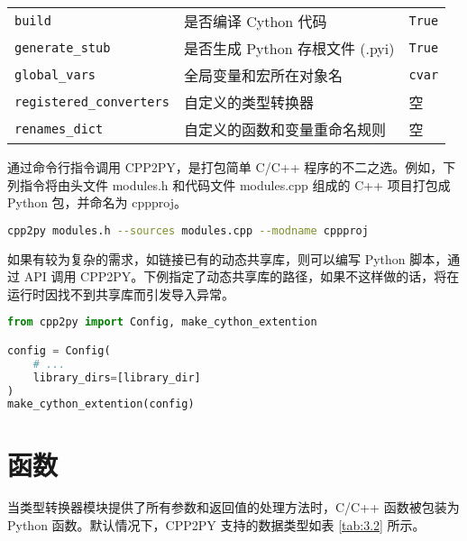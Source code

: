 \begin{table}
\begin{tabular}{lll}
     \lstinline$build$                  &  是否编译 Cython 代码                      &  \lstinline$True$     \\
     \lstinline$generate_stub$          &  是否生成 Python 存根文件 (.pyi)           &  \lstinline$True$     \\
     \lstinline$global_vars$            &  全局变量和宏所在对象名                    &  \lstinline$cvar$     \\
     \lstinline$registered_converters$  &  自定义的类型转换器                        &  空       \\
     \lstinline$renames_dict$           &  自定义的函数和变量重命名规则              &  空       \\
    \bottomrule
  \end{tabular}
  \label{tab:3.1}
\end{table}

通过命令行指令调用 CPP2PY，是打包简单 C/C++ 程序的不二之选。例如，下列指令将由头文件 modules.h 和代码文件 modules.cpp 组成的 C++ 项目打包成 Python 包，并命名为 cppproj。

\begin{framed}
\begin{lstlisting}[language=sh]
cpp2py modules.h --sources modules.cpp --modname cppproj
\end{lstlisting}
\end{framed}

如果有较为复杂的需求，如链接已有的动态共享库，则可以编写 Python 脚本，通过 API 调用 CPP2PY。下例指定了动态共享库的路径，如果不这样做的话，将在运行时因找不到共享库而引发导入异常。

\begin{framed}
\begin{lstlisting}[language=python]
from cpp2py import Config, make_cython_extention

config = Config(
    # ...
    library_dirs=[library_dir]
)
make_cython_extention(config)
\end{lstlisting}
\end{framed}

\section{函数}

当类型转换器模块提供了所有参数和返回值的处理方法时，C/C++ 函数被包装为 Python 函数。默认情况下，CPP2PY 支持的数据类型如表 \ref{tab:3.2} 所示。

